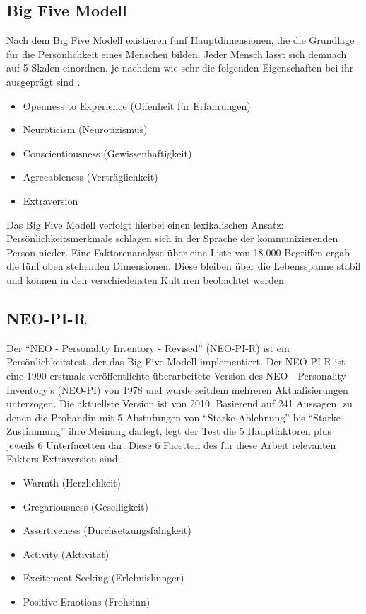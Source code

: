 \subsection{Big Five Modell}

Nach dem Big Five Modell existieren fünf Hauptdimensionen, die die Grundlage für die Persönlichkeit eines Menschen bilden.
Jeder Mensch lässt sich demnach auf 5 Skalen einordnen, je nachdem wie sehr die folgenden Eigenschaften bei ihr ausgeprägt sind \cite{john1999big}.

\begin{itemize}
  \item Openness to Experience (Offenheit für Erfahrungen)
  \item Neuroticism (Neurotizismus)
  \item Conscientiousness (Gewissenhaftigkeit)
  \item Agreeableness (Verträglichkeit)
  \item Extraversion
\end{itemize}

Das Big Five Modell verfolgt hierbei einen lexikalischen Ansatz: 
Persönlichkeitsmerkmale schlagen sich in der Sprache der kommunizierenden Person nieder.
Eine Faktorenanalyse über eine Liste von 18.000 Begriffen ergab die fünf oben stehenden Dimensionen.
Diese bleiben über die Lebensspanne stabil und können in den verschiedensten Kulturen beobachtet werden.

\subsection{NEO-PI-R}

Der "`NEO - Personality Inventory - Revised"' (NEO-PI-R) ist ein Persönlichkeitstest, der das Big Five Modell implementiert.
Der NEO-PI-R ist eine 1990 erstmals veröffentlichte überarbeitete Version des NEO - Personality Inventory's (NEO-PI) von 1978 und wurde seitdem mehreren Aktualisierungen unterzogen. Die aktuellste Version ist von 2010.
Basierend auf 241 Aussagen, zu denen die Probandin mit 5 Abstufungen von "`Starke Ablehnung"' bis "`Starke Zustimmung"' ihre Meinung darlegt, legt der Test die 5 Hauptfaktoren plus jeweils 6 Unterfacetten dar.
Diese 6 Facetten des für diese Arbeit relevanten Faktors Extraversion sind:

\begin{itemize}
  \item Warmth (Herzlichkeit)
  \item Gregariousness (Geselligkeit)
  \item Assertiveness (Durchsetzungsfähigkeit)
  \item Activity (Aktivität)
  \item Excitement-Seeking (Erlebnishunger)
  \item Positive Emotions (Frohsinn)
\end{itemize}

